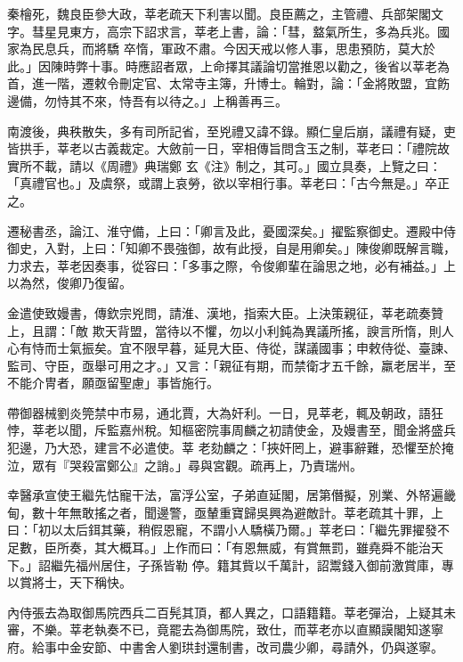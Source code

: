 \begin{pinyinscope}
 秦檜死，魏良臣參大政，莘老疏天下利害以聞。良臣薦之，主管禮、兵部架閣文字。彗星見東方，高宗下詔求言，莘老上書，論：「彗，盩氣所生，多為兵兆。國家為民息兵，而將驕
 卒惰，軍政不肅。今因天戒以修人事，思患預防，莫大於此。」因陳時弊十事。時應詔者眾，上命擇其議論切當推恩以勸之，後省以莘老為首，進一階，遷敕令刪定官、太常寺主簿，升博士。輪對，論：「金將敗盟，宜飭邊備，勿恃其不來，恃吾有以待之。」上稱善再三。



 南渡後，典秩散失，多有司所記省，至兇禮又諱不錄。顯仁皇后崩，議禮有疑，吏皆拱手，莘老以古義裁定。大斂前一日，宰相傳旨問含玉之制，莘老曰：「禮院故實所不載，請以《周禮》典瑞鄭
 玄《注》制之，其可。」國立具奏，上覽之曰：「真禮官也。」及虞祭，或謂上哀勞，欲以宰相行事。莘老曰：「古今無是。」卒正之。



 遷秘書丞，論江、淮守備，上曰：「卿言及此，憂國深矣。」擢監察御史。遷殿中侍御史，入對，上曰：「知卿不畏強御，故有此授，自是用卿矣。」陳俊卿既解言職，力求去，莘老因奏事，從容曰：「多事之際，令俊卿輩在論思之地，必有補益。」上以為然，俊卿乃復留。



 金遣使致嫚書，傳欽宗兇問，請淮、漢地，指索大臣。上決策親征，莘老疏奏贊上，且謂：「敵
 欺天背盟，當待以不懼，勿以小利鈍為異議所搖，諛言所惰，則人心有恃而士氣振矣。宜不限早暮，延見大臣、侍從，謀議國事；申敕侍從、臺諫、監司、守臣，亟舉可用之才。」又言：「親征有期，而禁衛才五千餘，羸老居半，至不能介冑者，願亟留聖慮」事皆施行。



 帶御器械劉炎筦禁中市易，通北賈，大為奸利。一日，見莘老，輒及朝政，語狂悖，莘老以聞，斥監嘉州稅。知樞密院事周麟之初請使金，及嫚書至，聞金將盛兵犯邊，乃大恐，建言不必遣使。莘
 老劾麟之：「挾奸罔上，避事辭難，恐懼至於掩泣，眾有『哭殺富鄭公』之誚。」尋與宮觀。疏再上，乃責瑞州。



 幸醫承宣使王繼先怙寵干法，富浮公室，子弟直延閣，居第僭擬，別業、外帑遍畿甸，數十年無敢搖之者，聞邊警，亟輦重寶歸吳興為避敵計。莘老疏其十罪，上曰：「初以太后鉺其藥，稍假恩寵，不謂小人驕橫乃爾。」莘老曰：「繼先罪擢發不足數，臣所奏，其大概耳。」上作而曰：「有恩無威，有賞無罰，雖堯舜不能治天下。」詔繼先福州居住，子孫皆勒
 停。籍其貲以千萬計，詔鬻錢入御前激賞庫，專以賞將士，天下稱快。



 內侍張去為取御馬院西兵二百髡其頂，都人異之，口語籍籍。莘老彈治，上疑其未審，不樂。莘老執奏不已，竟罷去為御馬院，致仕，而莘老亦以直顯謨閣知遂寧府。給事中金安節、中書舍人劉珙封還制書，改司農少卿，尋請外，仍與遂寧。




\end{pinyinscope}
